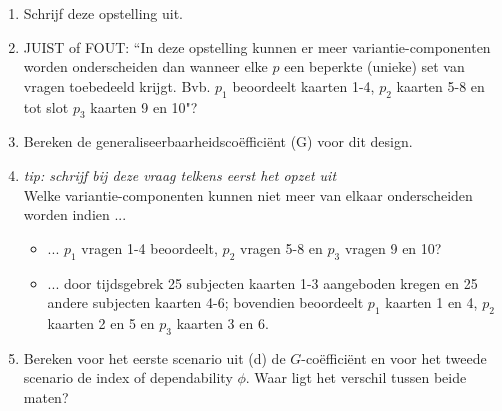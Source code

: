 {\begin{enumerate}
	\item Schrijf deze opstelling uit.
	\item JUIST of FOUT: ``In deze opstelling kunnen er meer variantie-componenten worden onderscheiden dan wanneer elke $p$ een beperkte (unieke) set van vragen toebedeeld krijgt. Bvb. $p_1$ beoordeelt kaarten 1-4, $p_2$ kaarten 5-8 en tot slot $p_3$ kaarten 9 en 10"?
	\item Bereken de generaliseerbaarheidsco\"{e}ffici\"{e}nt (G) voor dit design.
	\item \emph{tip: schrijf bij deze vraag telkens eerst het opzet uit}\\
	Welke variantie-componenten kunnen niet meer van elkaar onderscheiden worden indien ...
\begin{itemize}
	\item ... $p_1$ vragen 1-4 beoordeelt, $p_2$ vragen 5-8 en $p_3$ vragen 9 en 10?
	\item ... door tijdsgebrek 25 subjecten kaarten 1-3 aangeboden kregen en 25 andere subjecten kaarten 4-6; bovendien beoordeelt $p_1$ kaarten 1 en 4, $p_2$ kaarten 2 en 5 en $p_3$ kaarten 3 en 6.
\end{itemize}
\item Bereken voor het eerste scenario uit (d) de $G$-co\"{e}ffici\"{e}nt en voor het tweede scenario de index of dependability $\phi$. Waar ligt het verschil tussen beide maten?
\end{enumerate}
}

